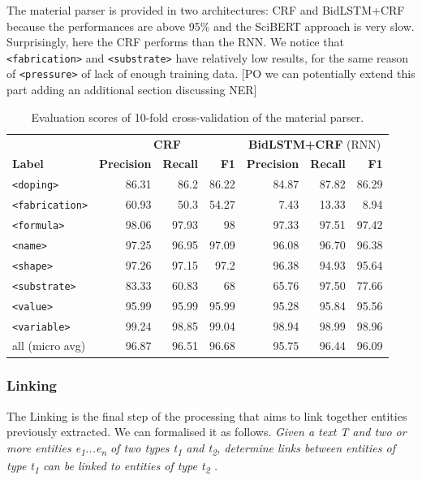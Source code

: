\documentclass{article}
\begin{document}
The material parser is provided in two architectures: CRF and BidLSTM+CRF because the performances are above 95\% and the SciBERT approach is very slow. 
Surprisingly, here the CRF performs than the RNN. We notice that \texttt{<fabrication>} and \texttt{<substrate>} have relatively low results, for the same reason of \texttt{<pressure>} of lack of enough training data.
[PO we can potentially extend this part adding an additional section discussing NER]

\begin{table}[ht]
\centering\small
\begin{tabular}{lrrrrrr}
\toprule
& \multicolumn{3}{c}{\textbf{CRF}} & \multicolumn{3}{c}{\textbf{BidLSTM+CRF} (RNN)}\\
\cmidrule(lr){2-4}\cmidrule(lr){5-7}
\textbf{Label} & \textbf{Precision} & \textbf{Recall} & \textbf{F1} & \textbf{Precision} & \textbf{Recall} & \textbf{F1} \\
\midrule
\texttt{<doping>}      & 86.31   & 86.2     & 86.22 & 84.87 &  87.82 & 86.29   \\
\texttt{<fabrication>} & 60.93   & 50.3     & 54.27 & 7.43  &  13.33 & 8.94   \\
\texttt{<formula>}     & 98.06   & 97.93    & 98    & 97.33 &  97.51 & 97.42  \\
\texttt{<name>}        & 97.25   & 96.95    & 97.09 & 96.08 &  96.70 & 96.38  \\
\texttt{<shape>}       & 97.26   & 97.15    & 97.2  & 96.38 &  94.93 & 95.64  \\
\texttt{<substrate>}   & 83.33   & 60.83    & 68    & 65.76 &  97.50 & 77.66  \\
\texttt{<value>}       & 95.99   & 95.99    & 95.99 & 95.28 &  95.84 & 95.56  \\
\texttt{<variable>}    & 99.24   & 98.85    & 99.04 & 98.94 &  98.99 & 98.96  \\
\midrule
all  (micro avg)       & 96.87   & 96.51    & 96.68  & 95.75 &   96.44  &  96.09  \\
\bottomrule
\end{tabular}
\caption{\label{tab:evaluation-10fold-material-parser} Evaluation scores of 10-fold cross-validation of the material parser. }
\end{table}


\subsubsection{Linking}

The Linking is the final step of the processing that aims to link together entities previously extracted.
We can formalised it as follows. \textit{Given a text T and two or more entities e\textsubscript{1}...e\textsubscript{n} of two types t\textsubscript{1} and t\textsubscript{2}, determine links between entities of type t\textsubscript{1} can be linked to entities of type t\textsubscript{2} .} 
\end{document}
